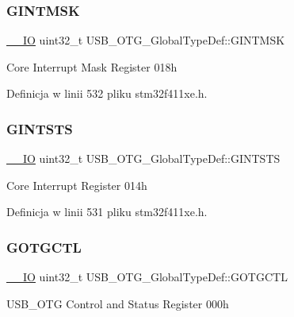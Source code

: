 \subsubsection{\texorpdfstring{G\+I\+N\+T\+M\+SK}{GINTMSK}}
{\footnotesize\ttfamily \hyperlink{core__sc300_8h_aec43007d9998a0a0e01faede4133d6be}{\+\_\+\+\_\+\+IO} uint32\+\_\+t U\+S\+B\+\_\+\+O\+T\+G\+\_\+\+Global\+Type\+Def\+::\+G\+I\+N\+T\+M\+SK}

Core Interrupt Mask Register 018h 

Definicja w linii 532 pliku stm32f411xe.\+h.

\mbox{\label{struct_u_s_b___o_t_g___global_type_def_a0c0a00511f6c07b8609b54adb14319da}} 
\subsubsection{\texorpdfstring{G\+I\+N\+T\+S\+TS}{GINTSTS}}
{\footnotesize\ttfamily \hyperlink{core__sc300_8h_aec43007d9998a0a0e01faede4133d6be}{\+\_\+\+\_\+\+IO} uint32\+\_\+t U\+S\+B\+\_\+\+O\+T\+G\+\_\+\+Global\+Type\+Def\+::\+G\+I\+N\+T\+S\+TS}

Core Interrupt Register 014h 

Definicja w linii 531 pliku stm32f411xe.\+h.

\mbox{\label{struct_u_s_b___o_t_g___global_type_def_a44d3a8825526e6f362da26bbdfb9c71d}} 
\subsubsection{\texorpdfstring{G\+O\+T\+G\+C\+TL}{GOTGCTL}}
{\footnotesize\ttfamily \hyperlink{core__sc300_8h_aec43007d9998a0a0e01faede4133d6be}{\+\_\+\+\_\+\+IO} uint32\+\_\+t U\+S\+B\+\_\+\+O\+T\+G\+\_\+\+Global\+Type\+Def\+::\+G\+O\+T\+G\+C\+TL}

U\+S\+B\+\_\+\+O\+TG Control and Status Register 000h 

